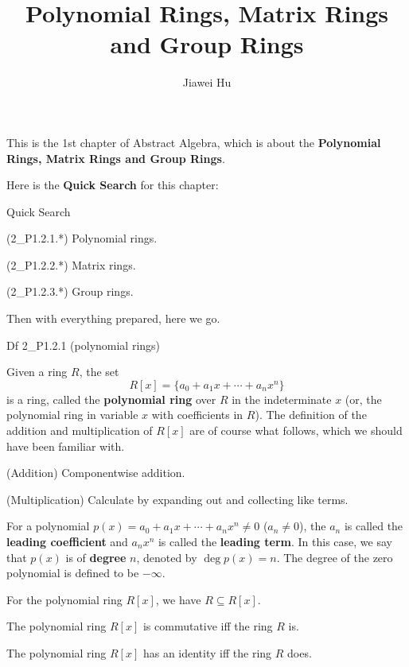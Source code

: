 \documentclass{article}
\title{\LARGE \textbf{Polynomial Rings, Matrix Rings and Group Rings}}
\author{\large Jiawei Hu}
\begin{document}
\maketitle

This is the 1st chapter of Abstract Algebra, which is about the \textbf{Polynomial Rings, Matrix Rings and Group Rings}. 

Here is the \textbf{Quick Search} for this chapter:
\begin{Th}{Quick Search}
    \begin{compactdesc}
        \item (2\_P1.2.1.*) Polynomial rings.
        \item (2\_P1.2.2.*) Matrix rings.
        \item (2\_P1.2.3.*) Group rings.
    \end{compactdesc}
\end{Th}

Then with everything prepared, here we go. 

\begin{Df}{Df 2\_P1.2.1 (polynomial rings)}
    \begin{compactenum}
        \item Given a ring $R$, the set 
        $$ R[x] = \{a_0 + a_1 x + \cdots + a_n x^n\} $$
        \textcolor{Th}{is a ring,} called the \textbf{polynomial ring} over $R$ in the indeterminate $x$ (or, the polynomial ring in variable $x$ with coefficients in $R$). The definition of the addition and multiplication of $R[x]$ are of course what follows, which we should have been familiar with.
        \begin{compactenum}
            \item (Addition) Componentwise addition.
            \item (Multiplication) Calculate by expanding out and collecting like terms.
        \end{compactenum}
        For a polynomial $p(x) = a_0 + a_1 x + \cdots + a_n x^n\neq 0$ ($a_n\neq 0$), the $a_n$ is called the \textbf{leading coefficient} and $a_nx^n$ is called the \textbf{leading term}. In this case, we say that $p(x)$ is of \textbf{degree} $n$, denoted by $\deg p(x) = n$. The degree of the zero polynomial is defined to be $-\infty$. 
        \item \textcolor{Th}{For the polynomial ring $R[x]$, we have $R\subseteq R[x]$.}
        \item \textcolor{Th}{The polynomial ring $R[x]$ is commutative iff the ring $R$ is.}
        \item \textcolor{Th}{The polynomial ring $R[x]$ has an identity iff the ring $R$ does.}
    \end{compactenum}
\end{Df}
\end{document}
